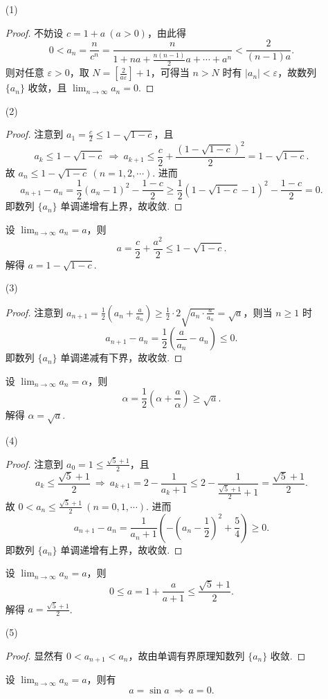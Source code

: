 \begin{enumerate}
    \item[(1)]
    \begin{proof}
        不妨设 $c = 1 + a \ (a > 0)$，由此得
        \[
            0 < a_n = \frac n {c^n} = \frac n {1 + na + \frac {n(n-1)} 2 a + \cdots + a^n} < \frac 2 {(n-1)a}.
        \]
        则对任意 $\varepsilon > 0$，取 $N = \left[ \frac 2 {a\varepsilon} \right] + 1$，可得当 $n > N$ 时有 $|a_n| < \varepsilon$，故数列 $\{ a_n \}$ 收敛，且 $\lim_{n \to \infty} a_n = 0$.
    \end{proof}
    \item[(2)]
    \begin{proof}
        注意到 $a_1 = \frac c 2 \leqslant 1 - \sqrt{1-c}$，且
        \[
            a_k \leqslant 1 - \sqrt{1-c} \ \Rightarrow \ a_{k+1} \leqslant \frac c 2 + \frac {(1-\sqrt{1-c})^2} 2 = 1 - \sqrt{1-c}.
        \]
        故 $a_n \leqslant 1 - \sqrt{1-c} \ (n = 1, 2, \cdots)$. 进而
        \[
            a_{n+1} - a_n = \frac 1 2 (a_n - 1)^2 - \frac {1-c} 2 \geqslant \frac 1 2 (1 - \sqrt{1-c} - 1)^2 - \frac {1-c} 2 = 0.
        \]
        即数列 $\{ a_n \}$ 单调递增有上界，故收敛.
    \end{proof}
    设 $\lim_{n \to \infty} a_n = a$，则
    \[
        a = \frac c 2 + \frac {a^2} 2 \leqslant 1 - \sqrt{1-c}.
    \]
    解得 $a = 1 - \sqrt{1-c}$.
    \item[(3)]
    \begin{proof}
        注意到 $a_{n+1} = \frac 1 2 \left( a_n + \frac a {a_n} \right) \geqslant \frac 1 2 \cdot 2 \sqrt{a_n \cdot \frac a {a_n}} = \sqrt a$，则当 $n \geqslant 1$ 时
        \[
            a_{n+1} - a_n = \frac 1 2 \left( \frac a {a_n} - a_n \right) \leqslant 0.
        \]
        即数列 $\{ a_n \}$ 单调递减有下界，故收敛.
    \end{proof}
    设 $\lim_{n \to \infty} a_n = \alpha$，则
    \[
        \alpha = \frac 1 2 \left( \alpha + \frac a \alpha \right) \geqslant \sqrt a.
    \]
    解得 $\alpha = \sqrt a$.
    \item[(4)]
    \begin{proof}
        注意到 $a_0 = 1 \leqslant \frac {\sqrt 5 + 1} 2$，且
        \[
            a_k \leqslant \frac {\sqrt 5 + 1} 2 \ \Rightarrow \ a_{k+1} = 2 - \frac 1 {a_k + 1} \leqslant 2 - \frac 1 {\frac {\sqrt 5 + 1} 2 + 1} = \frac {\sqrt 5 + 1} 2.
        \]
        故 $0 < a_n \leqslant \frac {\sqrt 5 + 1} 2 \ (n = 0, 1, \cdots)$. 进而
        \[
            a_{n+1} - a_n = \frac 1 {a_n + 1} \left( -\left( a_n - \frac 1 2 \right)^2 + \frac 5 4 \right) \geqslant 0.
        \]
        即数列 $\{ a_n \}$ 单调递增有上界，故收敛.
    \end{proof}
    设 $\lim_{n \to \infty} a_n = a$，则
    \[
        0 \leqslant a = 1 + \frac a {a+1} \leqslant \frac {\sqrt 5 + 1} 2.
    \]
    解得 $a = \frac {\sqrt 5 + 1} 2$.
    \item[(5)]
    \begin{proof}
        显然有 $0 < a_{n+1} < a_n$，故由单调有界原理知数列 $\{ a_n \}$ 收敛.
    \end{proof}
    设 $\lim_{n \to \infty} a_n = a$，则有
    \[
        a = \sin a \ \Rightarrow \ a = 0.
    \]
\end{enumerate}

